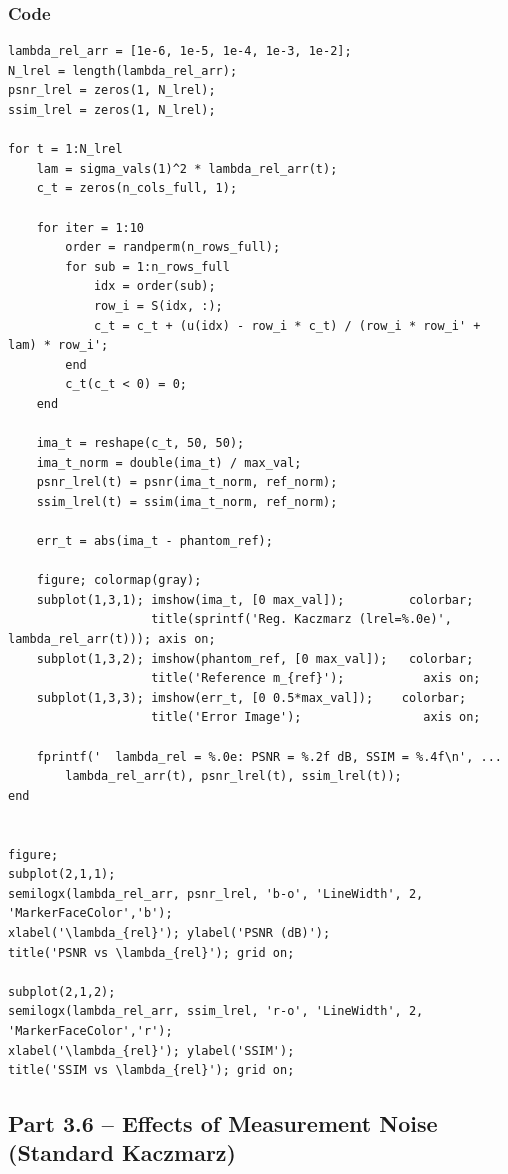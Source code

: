 \documentclass[12pt,a4paper]{article}
\begin{document}
\subsubsection*{Code}
\begin{lstlisting}
lambda_rel_arr = [1e-6, 1e-5, 1e-4, 1e-3, 1e-2];
N_lrel = length(lambda_rel_arr);
psnr_lrel = zeros(1, N_lrel);
ssim_lrel = zeros(1, N_lrel);

for t = 1:N_lrel
    lam = sigma_vals(1)^2 * lambda_rel_arr(t);
    c_t = zeros(n_cols_full, 1);

    for iter = 1:10
        order = randperm(n_rows_full);
        for sub = 1:n_rows_full
            idx = order(sub);
            row_i = S(idx, :);
            c_t = c_t + (u(idx) - row_i * c_t) / (row_i * row_i' + lam) * row_i';
        end
        c_t(c_t < 0) = 0;
    end

    ima_t = reshape(c_t, 50, 50);
    ima_t_norm = double(ima_t) / max_val;
    psnr_lrel(t) = psnr(ima_t_norm, ref_norm);
    ssim_lrel(t) = ssim(ima_t_norm, ref_norm);

    err_t = abs(ima_t - phantom_ref);

    figure; colormap(gray);
    subplot(1,3,1); imshow(ima_t, [0 max_val]);         colorbar;
                    title(sprintf('Reg. Kaczmarz (lrel=%.0e)', lambda_rel_arr(t))); axis on;
    subplot(1,3,2); imshow(phantom_ref, [0 max_val]);   colorbar;
                    title('Reference m_{ref}');           axis on;
    subplot(1,3,3); imshow(err_t, [0 0.5*max_val]);    colorbar;
                    title('Error Image');                 axis on;

    fprintf('  lambda_rel = %.0e: PSNR = %.2f dB, SSIM = %.4f\n', ...
        lambda_rel_arr(t), psnr_lrel(t), ssim_lrel(t));
end


figure;
subplot(2,1,1);
semilogx(lambda_rel_arr, psnr_lrel, 'b-o', 'LineWidth', 2, 'MarkerFaceColor','b');
xlabel('\lambda_{rel}'); ylabel('PSNR (dB)');
title('PSNR vs \lambda_{rel}'); grid on;

subplot(2,1,2);
semilogx(lambda_rel_arr, ssim_lrel, 'r-o', 'LineWidth', 2, 'MarkerFaceColor','r');
xlabel('\lambda_{rel}'); ylabel('SSIM');
title('SSIM vs \lambda_{rel}'); grid on;
\end{lstlisting}

\subsection{Part 3.6 -- Effects of Measurement Noise (Standard Kaczmarz)}
\end{document}
